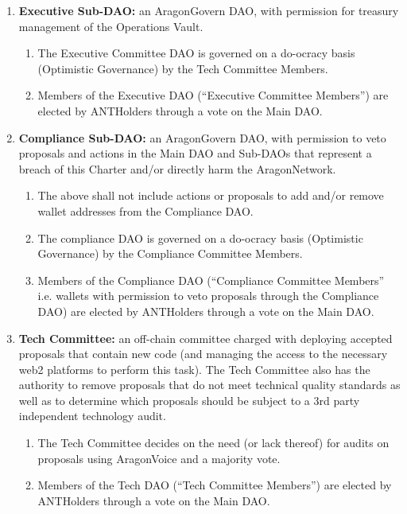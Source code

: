 \begin{enumerate}
\begin{enumerate}
		\begin{enumerate}
			\item \textbf{Executive Sub-\ac{DAO}:} an \gls{AragonGovern} \ac{DAO}, with permission for treasury management of the Operations Vault.
			\begin{enumerate}
				\item The Executive Committee \ac{DAO} is governed on a do-ocracy basis (Optimistic Governance) by the Tech Committee Members.
				\item Members of the Executive \ac{DAO} (``Executive Committee Members'') are elected by \glspl{ANTHolder} through a vote on the Main \ac{DAO}.
			\end{enumerate}
			\item \textbf{Compliance Sub-\ac{DAO}:} an \gls{AragonGovern} \ac{DAO}, with permission to veto proposals and actions in the Main \ac{DAO} and Sub-\acp{DAO} that represent a breach of this Charter and/or directly harm the \gls{AragonNetwork}.
			\begin{enumerate}
				\item The above shall not include actions or proposals to add and/or remove wallet addresses from the Compliance \ac{DAO}.
				\item The compliance \ac{DAO} is governed on a do-ocracy basis (Optimistic Governance) by the Compliance Committee Members.
				\item Members of the Compliance \ac{DAO} (``Compliance Committee Members'' i.e. wallets with permission to veto proposals through the Compliance \ac{DAO}) are elected by \glspl{ANTHolder} through a vote on the Main \ac{DAO}.
			\end{enumerate}
			\item \textbf{Tech Committee:} an off-chain committee charged with deploying accepted proposals that contain new code (and managing the access to the necessary web2 platforms to perform this task). The Tech Committee also has the authority to remove proposals that do not meet technical quality standards as well as to determine which proposals should be subject to a 3rd party independent technology audit.
			\begin{enumerate}
				\item The Tech Committee decides on the need (or lack thereof) for audits on proposals using \gls{AragonVoice} and a majority vote.
				\item Members of the Tech \ac{DAO} (``Tech Committee Members'') are elected by \glspl{ANTHolder} through a vote on the Main \ac{DAO}.
			\end{enumerate}


\end{enumerate}
\end{enumerate}
\end{enumerate}
